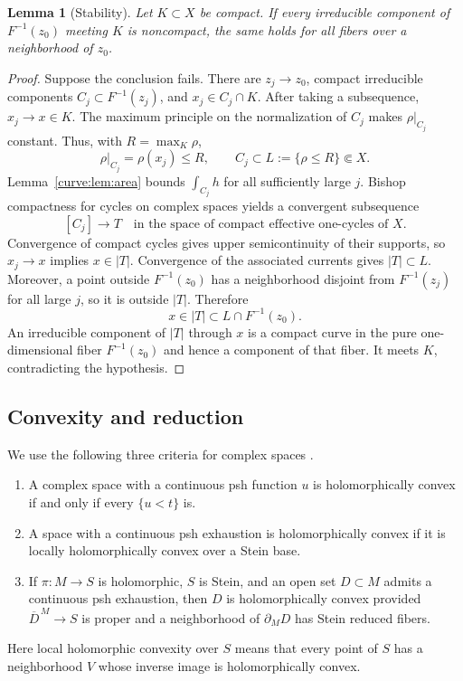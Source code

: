 \documentclass[11pt]{amsart}
\newtheorem{lemma}[theorem]{Lemma}
\theoremstyle{definition}
\theoremstyle{remark}
\numberwithin{equation}{section}
\begin{document}
\begin{lemma}[Stability]\label{curve:lem:stability}
Let $K\subset X$ be compact. If every irreducible component of
$F^{-1}(z_0)$ meeting $K$ is noncompact, the same holds for all
fibers over a neighborhood of $z_0$.
\end{lemma}
\begin{proof}
Suppose the conclusion fails. There are $z_j\to z_0$, compact
irreducible components $C_j\subset F^{-1}(z_j)$, and
$x_j\in C_j\cap K$. After taking a subsequence, $x_j\to x\in K$.
The maximum principle on the normalization of $C_j$ makes
$\rho|_{C_j}$ constant. Thus, with
$R=\max_K\rho$,
\[
 \rho|_{C_j}=\rho(x_j)\le R,\qquad
 C_j\subset L:=\{\rho\le R\}\Subset X.
\]
Lemma~\ref{curve:lem:area} bounds $\int_{C_j}h$ for all sufficiently
large $j$. Bishop compactness for cycles on complex spaces
\cite[Theorem~1]{Barlet1999} yields a convergent subsequence
\[
 [C_j]\longrightarrow T\quad\text{in the space of compact
 effective one-cycles of }X.
\]
Convergence of compact cycles gives upper semicontinuity of their
supports, so $x_j\to x$ implies $x\in|T|$. Convergence of the associated
currents gives $|T|\subset L$. Moreover, a point outside
$F^{-1}(z_0)$ has a neighborhood disjoint from $F^{-1}(z_j)$ for all
large $j$, so it is outside $|T|$. Therefore
\[
 x\in|T|\subset L\cap F^{-1}(z_0).
\]
An irreducible component of $|T|$ through $x$ is a compact curve
in the pure one-dimensional fiber $F^{-1}(z_0)$ and hence a component
of that fiber. It meets $K$, contradicting the hypothesis.
\end{proof}

\subsection{Convexity and reduction}
We use the following three criteria for complex spaces
\cite[Propositions~2.2, 2.4 and Corollary~2.5]{VijituForum2022}.
\begin{enumerate}[label=\textup{(\roman*)},leftmargin=2.5em]
\item A complex space with a continuous psh function $u$ is
holomorphically convex if and only if every $\{u<t\}$ is.
\item A space with a continuous psh exhaustion is holomorphically convex
if it is locally holomorphically convex over a Stein base.
\item If $\pi:M\to S$ is holomorphic, $S$ is Stein, and
an open set $D\subset M$ admits a continuous psh exhaustion, then
$D$ is holomorphically convex provided $\overline D^{\,M}\to S$ is
proper and a neighborhood
of $\partial_M D$ has Stein reduced fibers.
\end{enumerate}
Here local holomorphic convexity over $S$ means that
every point of $S$ has a neighborhood $V$ whose inverse image is
holomorphically convex.
\end{document}

